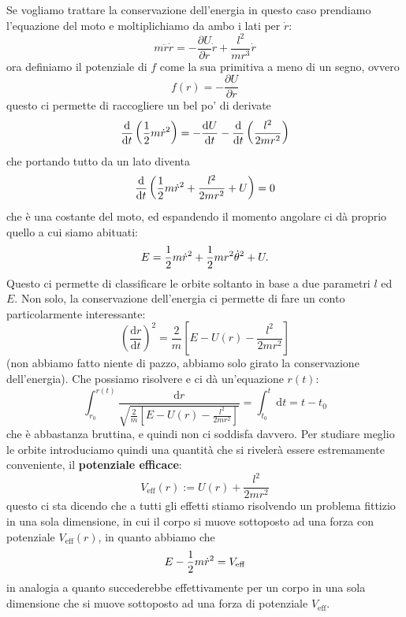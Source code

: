 \documentclass[11pt]{scrartcl}
\newcommand{\dif}{\text{d}}
\begin{document}
	Se vogliamo trattare la conservazione dell'energia in questo caso prendiamo l'equazione del moto e moltiplichiamo da ambo i lati per $\dot{r}$:
	$$m\ddot{r}\dot{r}=-\frac{\partial U}{\partial r}\dot{r}+\frac{l^2}{mr^3}\dot{r}$$
	ora definiamo il potenziale di $f$ come la sua primitiva a meno di un segno, ovvero
	$$f(r)=-\frac{\partial U}{\partial r}$$
	questo ci permette di raccogliere un bel po' di derivate
	$$\frac{\dif}{\dif t}\left(\half m \dot{r}^2\right)=-\frac{\dif U}{\dif t}-\frac{\dif}{\dif t}\left(\frac{l^2}{2mr^2}\right)$$
	che portando tutto da un lato diventa
	$$\frac{\dif}{\dif t}\left(\half m \dot{r}^2+\frac{l^2}{2mr^2}+U\right)=0$$
	che è una costante del moto, ed espandendo il momento angolare ci dà proprio quello a cui siamo abituati:
	$$E=\frac{1}{2} m \dot{r}^2+\frac{1}{2} m r^2\dot{\theta}^2+U.$$
	Questo ci permette di classificare le orbite soltanto in base a due parametri $l$ ed $E$. Non solo, la conservazione dell'energia ci permette di fare un conto particolarmente interessante:
	$$\left(\frac{\dif r}{\dif t}\right)^2=\frac{2}{m}\left[E-U(r)-\frac{l^2}{2mr^2}\right]$$
	(non abbiamo fatto niente di pazzo, abbiamo solo girato la conservazione dell'energia). Che possiamo risolvere e ci dà un'equazione $r(t)$:
	$$\int_{r_0}^{r(t)} \frac{\dif r}{\sqrt{\frac{2}{m}\left[E-U(r)-\frac{l^2}{2mr^2}\right]}}=\int_{t_0}^t \dif t = t-t_0$$
	che è abbastanza bruttina, e quindi non ci soddisfa davvero. Per studiare meglio le orbite introduciamo quindi una quantità che si rivelerà essere estremamente conveniente, il \textbf{potenziale efficace}:
	$$V_\text{eff}(r):=U(r)+\frac{l^2}{2mr^2}$$
	questo ci sta dicendo che a tutti gli effetti stiamo risolvendo un problema fittizio in una sola dimensione, in cui il corpo si muove sottoposto ad una forza con potenziale $V_\text{eff}(r)$, in quanto abbiamo che
	$$E-\frac{1}{2} m\dot{r}^2=V_\text{eff}$$
	in analogia a quanto succederebbe effettivamente per un corpo in una sola dimensione che si muove sottoposto ad una forza di potenziale $V_\text{eff}$.
	\begin{center}
	\end{center}
\end{document}
